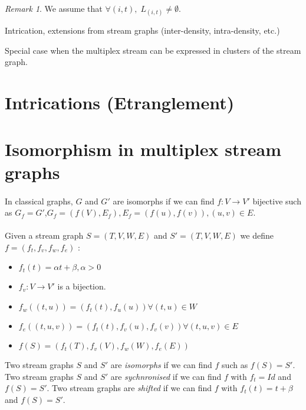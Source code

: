 \documentclass[dvipsnames,a4paper,11pt]{article}
\theoremstyle{definition}
\theoremstyle{remark}
\newtheorem{rmq}{Remark}
\begin{document}
    \begin{rmq}
    	We assume that $\forall (i,t), \; L_{(i,t)} \neq \emptyset$.
    \end{rmq}
	
    Intrication, extensions from stream graphs (inter-density, intra-density, etc.)

    Special case when the multiplex stream can be expressed in clusters of the stream graph.
    
    \section{Intrications (Etranglement)}
    
       
    \section{Isomorphism in multiplex stream graphs}
    \paragraph{}
    In classical graphs, $G$ and $G'$ are isomorphs if we can find $f:V \rightarrow V'$ bijective such as $G_f=G'$,$G_f=(f(V),E_f), E_f={(f(u),f(v)), (u,v) \in E}$.
    \paragraph{}
    Given a stream graph $S=(T,V,W,E)$ and $S'=(T,V,W,E)$ we define $f=(f_t,f_v,f_w,f_e)$ :
    \begin{itemize}
    	\item $f_t(t)=\alpha t + \beta, \alpha > 0$
    	\item $f_v:V\rightarrow V'$ is a bijection.
    	\item $f_w((t,u))=(f_t(t),f_u(u)) \forall (t,u) \in W$
    	\item $f_e((t,u,v))=(f_t(t),f_v(u),f_v(v)) \forall (t,u,v) \in E$
    	\item $f(S)=(f_t(T),f_v(V),f_w(W),f_e(E))$
    \end{itemize}
    
    Two stream graphs $S$ and $S'$ are {\em isomorphs } if we can find $f$ such as $f(S)=S'$.
    Two stream graphs $S$ and $S'$ are {\em sychnronised} if we can find $f$ with $f_t=Id$ and $f(S)=S'$.
    Two stream graphs are {\em shifted} if we can find $f$ with $f_t(t)=t+\beta$ and $f(S)=S'$.
    
    
\end{document}

